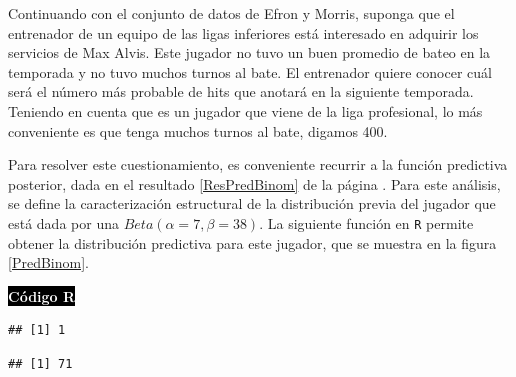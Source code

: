    \begin{Eje}
    Continuando con el conjunto de datos de Efron y Morris, suponga que el entrenador de un equipo de las ligas inferiores est\'a interesado en adquirir los servicios de Max Alvis. Este jugador no tuvo un buen promedio de bateo en la temporada y no tuvo muchos turnos al bate. El entrenador quiere conocer cu\'al ser\'a el n\'umero m\'as probable de hits que anotar\'a en la siguiente temporada. Teniendo en cuenta que es un jugador que viene de la liga profesional, lo m\'as conveniente es que tenga muchos turnos al bate, digamos 400.
    
    Para resolver este cuestionamiento, es conveniente recurrir a la funci\'on predictiva posterior, dada en el resultado \ref{ResPredBinom} de la p\'agina \pageref{ResPredBinom}. Para este an\'alisis, se define la caracterizaci\'on estructural de la distribuci\'on previa del jugador que est\'a dada por una $Beta(\alpha=7, \beta=38)$. La siguiente funci\'on en \texttt{R} permite obtener la distribuci\'on predictiva para este jugador, que se muestra en la figura \ref{PredBinom}.
    
    \colorbox{black}{\textcolor{white}{\textbf{C\'odigo R}}}
\begin{knitrout}
\color{fgcolor}\begin{kframe}
\begin{alltt}
 \hlkwb{<-} 
\hlkwb{<-} 
 \hlkwb{<-}
 \hlkwb{<-} 
 \hlkwb{<-} 

 \hlkwb{<-} \hlstd{(}\hlopt{+}\hlstd{)}
  \hlopt{:}
\hlstd{\{}
\hlstd{predictiva[(k}\hlopt{+}\hlstd{)]} \hlkwb{<-}
\hlopt{*}\hlopt{+}\hlopt{+}\hlopt{-}\hlopt{-}\hlopt{+}\hlopt{+}\hlopt{/}\hlopt{+}\hlopt{-}\hlopt{+}
\hlstd{\}}

\end{alltt}
\begin{verbatim}
## [1] 1
\end{verbatim}
\begin{alltt}
\hlopt{==}
\end{alltt}
\begin{verbatim}
## [1] 71
\end{verbatim}
\end{kframe}
\end{knitrout}
    

\end{Eje}
